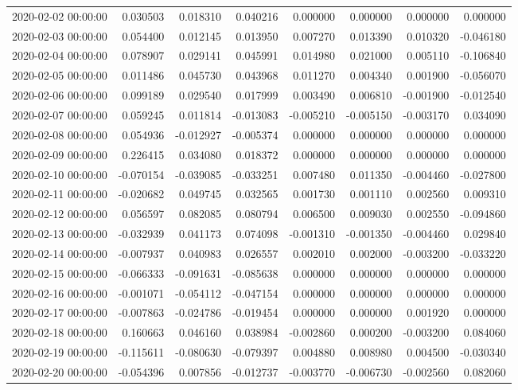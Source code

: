 \begin{tabular}{lrrrrrrr}
2020-02-02 00:00:00 & 0.030503 & 0.018310 & 0.040216 & 0.000000 & 0.000000 & 0.000000 & 0.000000 \\
2020-02-03 00:00:00 & 0.054400 & 0.012145 & 0.013950 & 0.007270 & 0.013390 & 0.010320 & -0.046180 \\
2020-02-04 00:00:00 & 0.078907 & 0.029141 & 0.045991 & 0.014980 & 0.021000 & 0.005110 & -0.106840 \\
2020-02-05 00:00:00 & 0.011486 & 0.045730 & 0.043968 & 0.011270 & 0.004340 & 0.001900 & -0.056070 \\
2020-02-06 00:00:00 & 0.099189 & 0.029540 & 0.017999 & 0.003490 & 0.006810 & -0.001900 & -0.012540 \\
2020-02-07 00:00:00 & 0.059245 & 0.011814 & -0.013083 & -0.005210 & -0.005150 & -0.003170 & 0.034090 \\
2020-02-08 00:00:00 & 0.054936 & -0.012927 & -0.005374 & 0.000000 & 0.000000 & 0.000000 & 0.000000 \\
2020-02-09 00:00:00 & 0.226415 & 0.034080 & 0.018372 & 0.000000 & 0.000000 & 0.000000 & 0.000000 \\
2020-02-10 00:00:00 & -0.070154 & -0.039085 & -0.033251 & 0.007480 & 0.011350 & -0.004460 & -0.027800 \\
2020-02-11 00:00:00 & -0.020682 & 0.049745 & 0.032565 & 0.001730 & 0.001110 & 0.002560 & 0.009310 \\
2020-02-12 00:00:00 & 0.056597 & 0.082085 & 0.080794 & 0.006500 & 0.009030 & 0.002550 & -0.094860 \\
2020-02-13 00:00:00 & -0.032939 & 0.041173 & 0.074098 & -0.001310 & -0.001350 & -0.004460 & 0.029840 \\
2020-02-14 00:00:00 & -0.007937 & 0.040983 & 0.026557 & 0.002010 & 0.002000 & -0.003200 & -0.033220 \\
2020-02-15 00:00:00 & -0.066333 & -0.091631 & -0.085638 & 0.000000 & 0.000000 & 0.000000 & 0.000000 \\
2020-02-16 00:00:00 & -0.001071 & -0.054112 & -0.047154 & 0.000000 & 0.000000 & 0.000000 & 0.000000 \\
2020-02-17 00:00:00 & -0.007863 & -0.024786 & -0.019454 & 0.000000 & 0.000000 & 0.001920 & 0.000000 \\
2020-02-18 00:00:00 & 0.160663 & 0.046160 & 0.038984 & -0.002860 & 0.000200 & -0.003200 & 0.084060 \\
2020-02-19 00:00:00 & -0.115611 & -0.080630 & -0.079397 & 0.004880 & 0.008980 & 0.004500 & -0.030340 \\
2020-02-20 00:00:00 & -0.054396 & 0.007856 & -0.012737 & -0.003770 & -0.006730 & -0.002560 & 0.082060 \\

\end{tabular}
